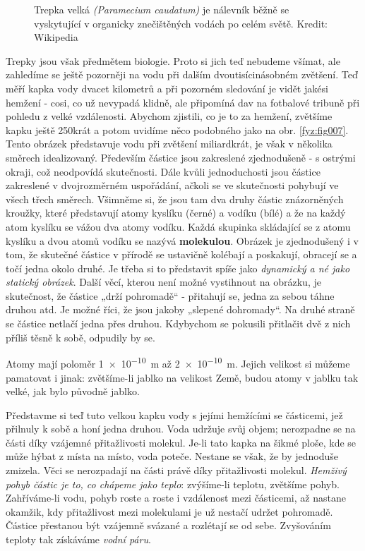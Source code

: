       \begin{figure}[ht!]  %
        \centering
        \caption{ Trepka velká \emph{(Paramecium caudatum)} je nálevník běžně se vyskytující v 
                  organicky znečištěných vodách po celém světě. Kredit: Wikipedia}
        \label{fyz:fig890}
      \end{figure} 

      Trepky jsou však předmětem biologie. Proto si jich teď nebudeme všímat, ale zahledíme se ještě
      pozorněji na vodu při dalším dvoutisícinásobném zvětšení. Teď měří kapka vody dvacet kilometrů
      a při pozorném sledování je vidět jakési hemžení - cosi, co už nevypadá klidně, ale připomíná
      dav na fotbalové tribuně při pohledu z velké vzdálenosti. Abychom zjistili, co je to za
      hemžení, zvětšíme kapku ještě 250krát a potom uvidíme něco podobného jako na obr.
      \ref{fyz:fig007}. Tento obrázek představuje vodu při zvětšení miliardkrát, je však v několika
      směrech idealizovaný. Především částice jsou zakreslené zjednodušeně - s ostrými okraji, což
      neodpovídá skutečnosti. Dále kvůli jednoduchosti jsou částice zakreslené v dvojrozměrném
      uspořádání, ačkoli se ve skutečnosti pohybují ve všech třech směrech. Všimněme si, že jsou tam
      dva druhy částic znázorněných kroužky, které představují atomy kyslíku (černé) a vodíku (bílé)
      a že na každý atom kyslíku se vážou dva atomy vodíku. Každá skupinka skládající se z atomu
      kyslíku a dvou atomů vodíku se nazývá \textbf{molekulou}. Obrázek je zjednodušený i v tom, že
      skutečné částice v přírodě se ustavičně kolébají a poskakují, obracejí se a točí jedna okolo
      druhé. Je třeba si to představit spíše jako \emph{dynamický a né jako statický obrázek}. Další
      věcí, kterou není možné vystihnout na obrázku, je skutečnost, že částice „drží pohromadě“ -
      přitahují se, jedna za sebou táhne druhou atd. Je možné říci, že jsou jakoby „slepené
      dohromady“. Na druhé straně se částice netlačí jedna přes druhou. Kdybychom se pokusili
      přitlačit dvě z nich příliš těsně k sobě, odpudily by se.

      Atomy mají poloměr \SI{1e-10}{\m} až \SI{2e-10}{\m}. Jejich velikost si můžeme pamatovat i 
      jinak: zvětšíme-li jablko na velikost Země, budou atomy v jablku tak velké, jak bylo původně 
      jablko.

      Představme si teď tuto velkou kapku vody s jejími hemžícími se částicemi, jež přilnuly k sobě 
      a honí jedna druhou. Voda udržuje svůj objem; nerozpadne se na části díky vzájemné 
      přitažlivosti molekul. Je-li tato kapka na šikmé ploše, kde se může hýbat z místa na místo, 
      voda poteče. Nestane se však, že by jednoduše zmizela. Věci se nerozpadají na části právě 
      díky přitažlivosti molekul. \emph{Hemživý pohyb částic je to, co chápeme jako teplo}: 
      zvýšíme-li teplotu, zvětšíme pohyb. Zahříváme-li vodu, pohyb roste a roste i vzdálenost mezi 
      částicemi, až nastane okamžik, kdy přitažlivost mezi molekulami je už nestačí udržet 
      pohromadě. Částice přestanou být vzájemně svázané a rozlétají se od sebe. Zvyšováním teploty 
      tak získáváme \emph{vodní páru}.  
      
